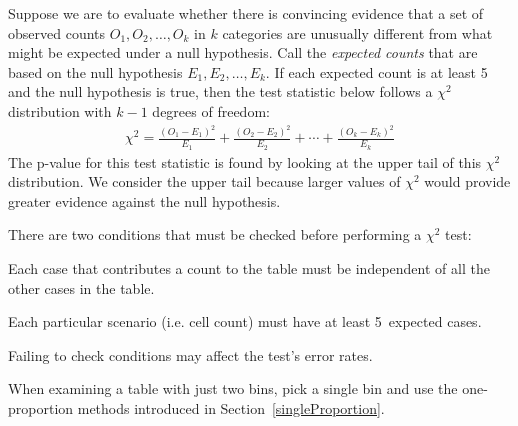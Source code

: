 \begin{termBox}{
Suppose we are to evaluate whether there is convincing evidence that a set of observed counts $O_1, O_2, \dots, O_k$ in $k$ categories are unusually different from what might be expected under a null hypothesis. Call the \emph{expected counts} that are based on the null hypothesis $E_1, E_2, \dots, E_k$. If each expected count is at least 5 and the null hypothesis is true, then the test statistic below follows a $\chi^2$ distribution with $k-1$ degrees of freedom:
\begin{align*}
\chi^2 = \frac{(O_1 - E_1)^2}{E_1} + \frac{(O_2 - E_2)^2}{E_2} + \cdots + \frac{(O_k - E_k)^2}{E_k}
\end{align*}
The p-value for this test statistic is found by looking at the upper tail of this $\chi^2$ distribution. We consider the upper tail because larger values of $\chi^2$ would provide greater evidence against the null hypothesis.}
\end{termBox}

\begin{tipBox}{
There are two conditions that must be checked before performing a $\chi^2$ test:\vspace{-1mm}
\begin{description}
\setlength{\itemsep}{0mm}
\item[Independence.] Each case that contributes a count to the table must be independent of all the other cases in the table.
\item[Sample size / distribution.] Each particular scenario (i.e. cell count) must have at least 5~expected cases.
\vspace{-1mm}
\end{description}
Failing to check conditions may affect the test's error rates.}
\end{tipBox}

When examining a table with just two bins, pick a single bin and use the one-proportion methods introduced in Section~\ref{singleProportion}.





